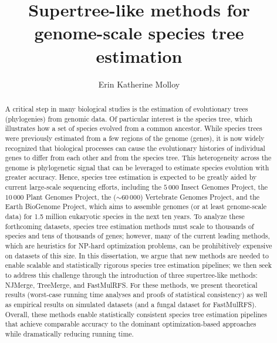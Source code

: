 \documentclass[tocnosub, noragright, centerchapter, fullpagesingle, 12pt]{uiuc_csthesis18}
\title{Supertree-like methods for genome-scale species tree estimation}
\author{Erin Katherine Molloy}
\theoremstyle{definition}
\numberwithin{algocf}{chapter}     %
\begin{document}
%

%
\maketitle


\frontmatter

%
\begin{abstract}
A critical step in many biological studies is the estimation of evolutionary trees (phylogenies) from genomic data.
Of particular interest is the species tree, which illustrates how a set of species evolved from a common ancestor.
While species trees were previously estimated from a few regions of the genome (genes), it is now widely recognized that biological processes can cause the evolutionary histories of individual genes to differ from each other and from the species tree.
This heterogeneity across the genome is phylogenetic signal that can be leveraged to estimate species evolution with greater accuracy.
Hence, species tree estimation is expected to be greatly aided by current large-scale sequencing efforts, including the $5\,000$ Insect Genomes Project, the $10\,000$ Plant Genomes Project, the ($\sim$$60\,000$) Vertebrate Genomes Project, and the Earth BioGenome Project, which aims to assemble genomes (or at least genome-scale data) for 1.5 million eukaryotic species in the next ten years.
To analyze these forthcoming datasets, species tree estimation methods must scale to thousands of species and tens of thousands of genes; however, many of the current leading methods, which are heuristics for NP-hard optimization problems, can be prohibitively expensive on datasets of this size.
In this dissertation, we argue that new methods are needed to enable scalable and statistically rigorous species tree estimation pipelines; we then seek to address this challenge through the introduction of three supertree-like methods: NJMerge, TreeMerge, and FastMulRFS. 
For these methods, we present theoretical results (worst-case running time analyses and proofs of statistical consistency) as well as empirical results on simulated  datasets (and a fungal dataset for FastMulRFS).
Overall, these methods enable statistically consistent species tree estimation pipelines  that achieve comparable accuracy to the dominant optimization-based approaches while dramatically reducing running time.
\end{abstract}
\end{document}
